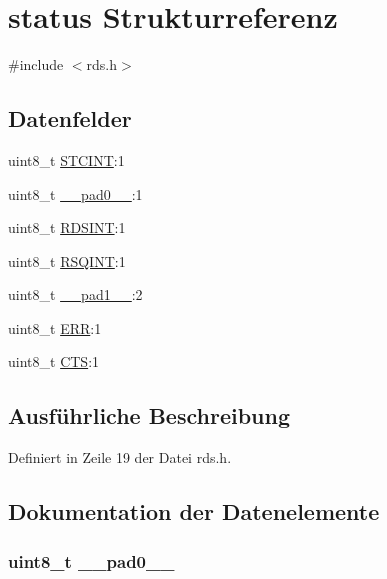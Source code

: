 \hypertarget{structstatus}{}\section{status Strukturreferenz}
\label{structstatus}


{\ttfamily \#include $<$rds.\+h$>$}

\subsection*{Datenfelder}
\begin{DoxyCompactItemize}
\item 
uint8\+\_\+t \hyperlink{structstatus_a1026d3a63b328db2451abc49e0bd5a2c}{S\+T\+C\+I\+N\+T}\+:1
\item 
uint8\+\_\+t \hyperlink{structstatus_a8b4eebe79ded0459acec2f4950102ba3}{\+\_\+\+\_\+pad0\+\_\+\+\_\+}\+:1
\item 
uint8\+\_\+t \hyperlink{structstatus_a4fac7351844086822dbf634529f6cfbd}{R\+D\+S\+I\+N\+T}\+:1
\item 
uint8\+\_\+t \hyperlink{structstatus_a9637ec0bb6d40570ea68a1b96c5d561e}{R\+S\+Q\+I\+N\+T}\+:1
\item 
uint8\+\_\+t \hyperlink{structstatus_a77f12d2e278bd5c07712648ac0df5e08}{\+\_\+\+\_\+pad1\+\_\+\+\_\+}\+:2
\item 
uint8\+\_\+t \hyperlink{structstatus_afb74dff3cfacd68c02883e5282ef2f59}{E\+R\+R}\+:1
\item 
uint8\+\_\+t \hyperlink{structstatus_a7f1760325354f291b9a0190e7e355ca8}{C\+T\+S}\+:1
\end{DoxyCompactItemize}


\subsection{Ausführliche Beschreibung}


Definiert in Zeile 19 der Datei rds.\+h.



\subsection{Dokumentation der Datenelemente}
\hypertarget{structstatus_a8b4eebe79ded0459acec2f4950102ba3}{}
\subsubsection[{\+\_\+\+\_\+pad0\+\_\+\+\_\+}]{\setlength{\rightskip}{0pt plus 5cm}uint8\+\_\+t \+\_\+\+\_\+pad0\+\_\+\+\_\+}\label{structstatus_a8b4eebe79ded0459acec2f4950102ba3}


